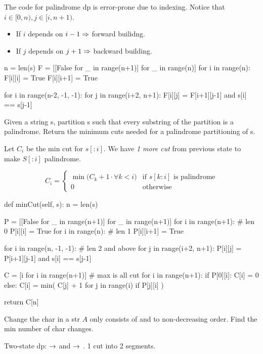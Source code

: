The code for palindrome dp is error-prone due to indexing. Notice that $i \in [0, n), j \in [i, n+1)$. 
\begin{itemize}
\item If $i$ depends on $i-1\Rightarrow$ forward builidng.
\item If $j$ depends on $j+1\Rightarrow$ backward building.
\end{itemize}
\begin{python}
n = len(s)
F = [[False for _ in range(n+1)] for _ in range(n)]
for i in range(n):
    F[i][i] = True
    F[i][i+1] = True

for i in range(n-2, -1, -1):
    for j in range(i+2, n+1):
        F[i][j] = F[i+1][j-1] and s[i] == s[j-1]
\end{python}
 Given a string s, partition s such that every substring of the partition is a palindrome. Return the minimum cuts needed for a palindrome partitioning of s.

Let $C_i$ be the min cut for $s[:i]$. We have \textit{1 more cut} from previous state to make $S[:i]$ palindrome. 

\[
C_{i} =
	\begin{cases}
	\min\big(C_k+1 \cdot \forall k<i \big) & \text{if } s[k:i] \text{ is palindrome} \\
	0 & \text{otherwise}
	\end{cases}
\]
\begin{python}
def minCut(self, s):
  n = len(s)

  P = [[False for _ in range(n+1)] for _ in range(n+1)]
  for i in range(n+1):  # len 0
    P[i][i] = True
  for i in range(n):  # len 1
    P[i][i+1] = True

  for i in range(n, -1, -1):  # len 2 and above
    for j in range(i+2, n+1):
      P[i][j] = P[i+1][j-1] and s[i] == s[j-1]

  C = [i for i in range(n+1)]  # max is all cut
  for i in range(n+1):
    if P[0][i]:
      C[i] = 0
    else:
      C[i] = min(
          C[j] + 1
          for j in range(i)
          if P[j][i]
      )

  return C[n]
\end{python}
 Change the char in a str $A$ only consists of  and  to non-decreasing order. Find the min number of char changes. 

Two-state dp:  $\rightarrow$  and   $\rightarrow$ . 1 cut into 2 segments.

